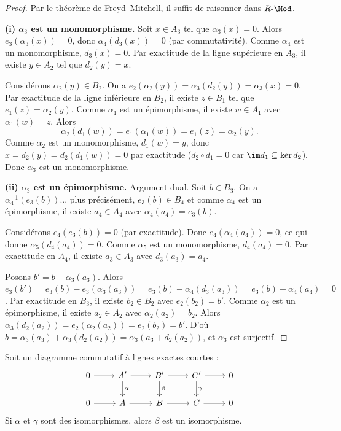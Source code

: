 \begin{proof}
Par le théorème de Freyd--Mitchell, il suffit de raisonner dans
$R\text{-}\Mod$.

\medskip
\textbf{(i) $\alpha_3$ est un monomorphisme.}
Soit $x \in A_3$ tel que $\alpha_3(x) = 0$. Alors
$e_3(\alpha_3(x)) = 0$, donc $\alpha_4(d_3(x)) = 0$
(par commutativité). Comme $\alpha_4$ est un monomorphisme,
$d_3(x) = 0$. Par exactitude de la ligne supérieure en $A_3$,
il existe $y \in A_2$ tel que $d_2(y) = x$.

Considérons $\alpha_2(y) \in B_2$. On a
$e_2(\alpha_2(y)) = \alpha_3(d_2(y)) = \alpha_3(x) = 0$.
Par exactitude de la ligne inférieure en $B_2$, il existe
$z \in B_1$ tel que $e_1(z) = \alpha_2(y)$.
Comme $\alpha_1$ est un épimorphisme, il existe $w \in A_1$
avec $\alpha_1(w) = z$. Alors
\[
  \alpha_2(d_1(w)) = e_1(\alpha_1(w)) = e_1(z) = \alpha_2(y).
\]
Comme $\alpha_2$ est un monomorphisme, $d_1(w) = y$, donc
$x = d_2(y) = d_2(d_1(w)) = 0$ par exactitude ($d_2 \circ d_1 = 0$
car $\im d_1 \subseteq \ker d_2$). Donc $\alpha_3$ est un monomorphisme.

\medskip
\textbf{(ii) $\alpha_3$ est un épimorphisme.}
Argument dual. Soit $b \in B_3$. On a
$\alpha_4^{-1}(e_3(b))$... plus précisément, $e_3(b) \in B_4$
et comme $\alpha_4$ est un épimorphisme, il existe $a_4 \in A_4$
avec $\alpha_4(a_4) = e_3(b)$.

Considérons $e_4(e_3(b)) = 0$ (par exactitude). Donc
$e_4(\alpha_4(a_4)) = 0$, ce qui donne $\alpha_5(d_4(a_4)) = 0$.
Comme $\alpha_5$ est un monomorphisme, $d_4(a_4) = 0$.
Par exactitude en $A_4$, il existe $a_3 \in A_3$ avec $d_3(a_3) = a_4$.

Posons $b' = b - \alpha_3(a_3)$. Alors
$e_3(b') = e_3(b) - e_3(\alpha_3(a_3)) = e_3(b) - \alpha_4(d_3(a_3))
= e_3(b) - \alpha_4(a_4) = 0$.
Par exactitude en $B_3$, il existe $b_2 \in B_2$ avec $e_2(b_2) = b'$.
Comme $\alpha_2$ est un épimorphisme, il existe $a_2 \in A_2$ avec
$\alpha_2(a_2) = b_2$. Alors
$\alpha_3(d_2(a_2)) = e_2(\alpha_2(a_2)) = e_2(b_2) = b'$.
D'où $b = \alpha_3(a_3) + \alpha_3(d_2(a_2)) = \alpha_3(a_3 + d_2(a_2))$,
et $\alpha_3$ est surjectif.
\end{proof}

\begin{corollaire}\label{cor:short-five}
Soit un diagramme commutatif à lignes exactes courtes :
\[
\begin{tikzcd}
0 \arrow[r] & A' \arrow[r] \arrow[d, "\alpha"] & B' \arrow[r] \arrow[d, "\beta"]
  & C' \arrow[r] \arrow[d, "\gamma"] & 0 \\
0 \arrow[r] & A \arrow[r] & B \arrow[r] & C \arrow[r] & 0
\end{tikzcd}
\]
Si $\alpha$ et $\gamma$ sont des isomorphismes, alors $\beta$ est un
isomorphisme.
\end{corollaire}

